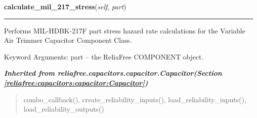    \label{reliafree:capacitors:variable:AirTrimmer:calculate_mil_217_stress}

    \vspace{0.5ex}

\hspace{.8\funcindent}\begin{boxedminipage}{\funcwidth}

    \raggedright \textbf{calculate\_mil\_217\_stress}(\textit{self}, \textit{part})

    \vspace{-1.5ex}

    \rule{\textwidth}{0.5\fboxrule}
\setlength{\parskip}{2ex}
    Performs MIL-HDBK-217F part stress hazard rate calculations for the 
    Variable Air Trimmer Capacitor Component Class.

    Keyword Arguments: part -- the ReliaFree COMPONENT object.

\setlength{\parskip}{1ex}
    \end{boxedminipage}


\large{\textbf{\textit{Inherited from reliafree.capacitors.capacitor.Capacitor\textit{(Section \ref{reliafree:capacitors:capacitor:Capacitor})}}}}

\begin{quote}
combo\_callback(), create\_reliability\_inputs(), load\_reliability\_inputs(), load\_reliability\_outputs()
\end{quote}
